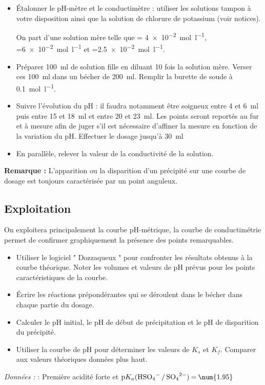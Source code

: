 \documentclass{tp}
\begin{document}
\begin{itemize}
  \item Étalonner le pH-mètre et le conductimètre : utiliser les solutions tampon à votre disposition ainsi que la solution de chlorure de potassium (voir notices).
 
 On part d'une solution mère telle que \ce{[Al^3+]} = \SI{4e-2}{\mole\per\litre}, \ce{[SO4^2-]}=\SI{6e-2}{\mole\per\litre} et \ce{[H2SO4]}=\SI{2.5e-2}{\mole\per\litre}.

 \item Préparer \SI{100}{\milli\litre} de solution fille en diluant 10 fois la solution mère. Verser ces \SI{100}{\milli\litre} dans un bécher de \SI{200}{\milli\litre}. Remplir la burette de soude à \SI{0.1}{\mole\per\litre}.

 \item Suivre l'évolution du pH : il faudra notamment être soigneux entre 4 et \SI{6}{\milli\litre} puis entre 15 et \SI{18}{\milli\litre} et entre 20 et \SI{23}{\milli\litre}. Les points seront reportés au fur et à mesure afin de juger s'il est nécessaire d'affiner la mesure en fonction de la variation du pH. Effectuer le dosage jusqu'à \SI{30}{\milli\litre}

 \item En parallèle, relever la valeur de la conductivité de la solution.
\end{itemize}
\textbf{Remarque : } L'apparition ou la disparition d'un précipité sur une courbe de dosage est toujours caractérisée par un point anguleux. 

\subsection{Exploitation}%
\label{sub:exploitation}

On exploitera principalement la courbe pH-métrique, la courbe de conductimétrie permet de confirmer graphiquement la présence des points remarquables.

\begin{itemize}
  \item Utiliser le logiciel " Dozzaqueux " pour confronter les résultats obtenus à la courbe théorique. Noter les volumes et valeurs de pH prévus pour les points caractéristiques de la courbe.

  \item Écrire les réactions prépondérantes qui se déroulent dans le bécher dans chaque partie du dosage.
  
  \item Calculer le pH initial, le pH de début de précipitation et le pH de disparition du précipité.

  \item Utiliser la courbe de pH pour déterminer les valeurs de $K_s$ et $K_f$. Comparer aux valeurs théoriques données plus haut.
\end{itemize}

\textit{Données : }  : Première acidité forte et $\mathrm{p}K_a(\ce{HSO4- / SO4^2-) = \num{1.95}}$ 
\end{document}
